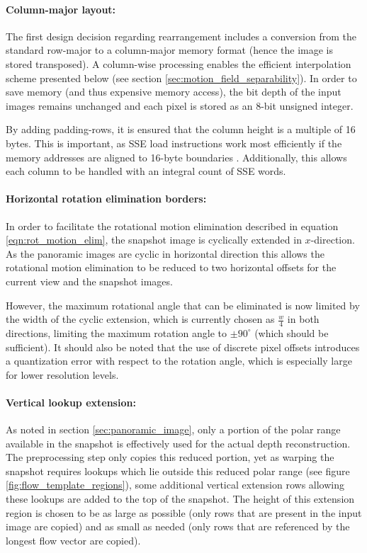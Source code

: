 \paragraph{Column-major layout:} The first design decision regarding rearrangement includes a conversion from the standard row-major to a column-major memory format (hence the image is stored transposed). A column-wise processing enables the efficient interpolation scheme presented below (see section \ref{sec:motion_field_separability}). In order to save memory (and thus expensive memory access), the bit depth of the input images remains unchanged and each pixel is stored as an 8-bit unsigned integer.

By adding padding-rows, it is ensured that the column height is a multiple of 16 bytes. This is important, as SSE load instructions work most efficiently if the memory addresses are aligned to 16-byte boundaries \citep[chapter 4.4, ``stack and data alignment'']{IntelOptimizationHandbook}. Additionally, this allows each column to be handled with an integral count of SSE words.

\paragraph{Horizontal rotation elimination borders:} In order to facilitate the rotational motion elimination described in equation \ref{eqn:rot_motion_elim}, the snapshot image is cyclically extended in $x$-direction. As the panoramic images are cyclic in horizontal direction this allows the rotational motion elimination to be reduced to two horizontal offsets for the current view and the snapshot images.

However, the maximum rotational angle that can be eliminated is now limited by the width of the cyclic extension, which is currently chosen as $\frac{w}4$ in both directions, limiting the maximum rotation angle to $\pm 90^\circ$ (which should be sufficient). It should also be noted that the use of discrete pixel offsets introduces a quantization error with respect to the rotation angle, which is especially large for lower resolution levels.

\paragraph{Vertical lookup extension:} As noted in section \ref{sec:panoramic_image}, only a portion of the polar range available in the snapshot is effectively used for the actual depth reconstruction. The preprocessing step only copies this reduced portion, yet as warping the snapshot requires lookups which lie outside this reduced polar range (see figure \ref{fig:flow_template_regions}), some additional vertical extension rows allowing these lookups are added to the top of the snapshot. The height of this extension region is chosen to be as large as possible (only rows that are present in the input image are copied) and as small as needed (only rows that are referenced by the longest flow vector are copied).

